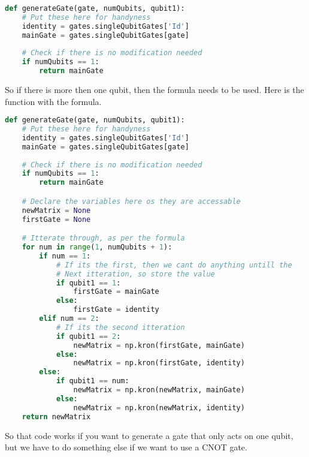 \documentclass[../main.tex]{subfiles}
\begin{document}
\begin{lstlisting}[language=Python]
def generateGate(gate, numQubits, qubit1):
	# Put these here for handyness
    identity = gates.singleQubitGates['Id']
    mainGate = gates.singleQubitGates[gate]
    
    # Check if there is no modification needed
    if numQubits == 1:
    	return mainGate
\end{lstlisting}

So if there is more then one qubit, then the formula needs to be used. Here is the function with the formula.

\begin{lstlisting}[language=Python]
def generateGate(gate, numQubits, qubit1):
	# Put these here for handyness
    identity = gates.singleQubitGates['Id']
    mainGate = gates.singleQubitGates[gate]
    
    # Check if there is no modification needed
    if numQubits == 1:
    	return mainGate

	# Declare the variables here os they are accessable
    newMatrix = None
    firstGate = None

	# Itterate through, as per the formula
    for num in range(1, numQubits + 1):
        if num == 1:
            # If its the first, then we cant do anything untill the
            # Next itteration, so store the value
            if qubit1 == 1:
                firstGate = mainGate
            else:
                firstGate = identity
        elif num == 2:
            # If its the second itteration
            if qubit1 == 2:
                newMatrix = np.kron(firstGate, mainGate)
            else:
                newMatrix = np.kron(firstGate, identity)
        else:
            if qubit1 == num:
                newMatrix = np.kron(newMatrix, mainGate)
            else:
                newMatrix = np.kron(newMatrix, identity)
    return newMatrix
\end{lstlisting}

So that code works if you want to generate a gate that only acts on one qubit, but we have to do something else if we want to use a CNOT gate.
\end{document}
